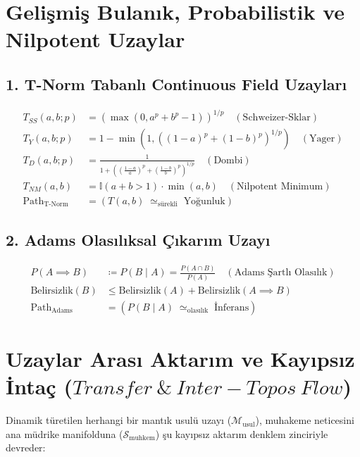 \documentclass[11pt, a4paper]{article}
\begin{document}
\section{Gelişmiş Bulanık, Probabilistik ve Nilpotent Uzaylar}

\subsection{1. T-Norm Tabanlı Continuous Field Uzayları}
\begin{align}
T_{SS}(a, b; p) &= \left( \max(0, a^p + b^p - 1) \right)^{1/p} \quad (\text{Schweizer-Sklar}) \\
T_{Y}(a, b; p) &= 1 - \min\left(1, \left((1-a)^p + (1-b)^p\right)^{1/p}\right) \quad (\text{Yager}) \\
T_{D}(a, b; p) &= \frac{1}{1 + \left( \left(\frac{1-a}{a}\right)^p + \left(\frac{1-b}{b}\right)^p \right)^{1/p}} \quad (\text{Dombi}) \\
T_{NM}(a, b) &= \mathbb{I}(a+b > 1) \cdot \min(a, b) \quad (\text{Nilpotent Minimum}) \\
\text{Path}_{\text{T-Norm}} &= (T(a, b) \;\simeq_{\text{sürekli}}\; \text{Yoğunluk})
\end{align}

\subsection{2. Adams Olasılıksal Çıkarım Uzayı}
\begin{align}
P(A \implies B) &\coloneqq P(B \mid A) = \frac{P(A \cap B)}{P(A)} \quad (\text{Adams Şartlı Olasılık}) \\
\text{Belirsizlik}(B) &\le \text{Belirsizlik}(A) + \text{Belirsizlik}(A \implies B) \\
\text{Path}_{\text{Adams}} &= (P(B \mid A) \;\simeq_{\text{olasılık}}\; \text{İnferans})
\end{align}

\section{Uzaylar Arası Aktarım ve Kayıpsız İntaç ($Transfer\ \&\ Inter-Topos\ Flow$)}

Dinamik türetilen herhangi bir mantık usulü uzayı ($\mathcal{M}_{\text{usul}}$), muhakeme neticesini ana müdrike manifolduna ($\mathcal{S}_{\text{muhkem}}$) şu kayıpsız aktarım denklem zinciriyle devreder:
\end{document}
